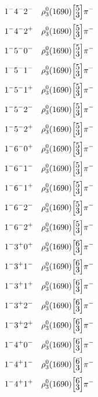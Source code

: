 \documentclass[10pt,a4paper]{article}
\def\dst{\displaystyle}
\def\vsp{\hbox{\vrule height12.5pt depth3.5pt width0pt}}
\def\ells#1#2{\Big[\hskip-5pt\vsp\begin{array}{c}\dst#1\\[-4pt]\dst#2\end{array}\vsp\hskip-5pt\Big]}
\begin{document}
\begin{align*} 
 \begin{aligned}
1^{-}4^{-}2^{-}\quad & \rho_3^0(1690)\ells{5}{3}\pi^-\\
1^{-}4^{-}2^{+}\quad & \rho_3^0(1690)\ells{5}{3}\pi^-\\
1^{-}5^{-}0^{-}\quad & \rho_3^0(1690)\ells{5}{3}\pi^-\\
1^{-}5^{-}1^{-}\quad & \rho_3^0(1690)\ells{5}{3}\pi^-\\
1^{-}5^{-}1^{+}\quad & \rho_3^0(1690)\ells{5}{3}\pi^-\\
1^{-}5^{-}2^{-}\quad & \rho_3^0(1690)\ells{5}{3}\pi^-\\
1^{-}5^{-}2^{+}\quad & \rho_3^0(1690)\ells{5}{3}\pi^-\\
1^{-}6^{-}0^{+}\quad & \rho_3^0(1690)\ells{5}{3}\pi^-\\
1^{-}6^{-}1^{-}\quad & \rho_3^0(1690)\ells{5}{3}\pi^-\\
1^{-}6^{-}1^{+}\quad & \rho_3^0(1690)\ells{5}{3}\pi^-\\
1^{-}6^{-}2^{-}\quad & \rho_3^0(1690)\ells{5}{3}\pi^-\\
1^{-}6^{-}2^{+}\quad & \rho_3^0(1690)\ells{5}{3}\pi^-\\
1^{-}3^{+}0^{+}\quad & \rho_3^0(1690)\ells{6}{3}\pi^-\\
1^{-}3^{+}1^{-}\quad & \rho_3^0(1690)\ells{6}{3}\pi^-\\
1^{-}3^{+}1^{+}\quad & \rho_3^0(1690)\ells{6}{3}\pi^-\\
1^{-}3^{+}2^{-}\quad & \rho_3^0(1690)\ells{6}{3}\pi^-\\
1^{-}3^{+}2^{+}\quad & \rho_3^0(1690)\ells{6}{3}\pi^-\\
1^{-}4^{+}0^{-}\quad & \rho_3^0(1690)\ells{6}{3}\pi^-\\
1^{-}4^{+}1^{-}\quad & \rho_3^0(1690)\ells{6}{3}\pi^-\\
1^{-}4^{+}1^{+}\quad & \rho_3^0(1690)\ells{6}{3}\pi^-\\
\end{aligned} 
 \end{align*}\pagebreak
\end{document}
